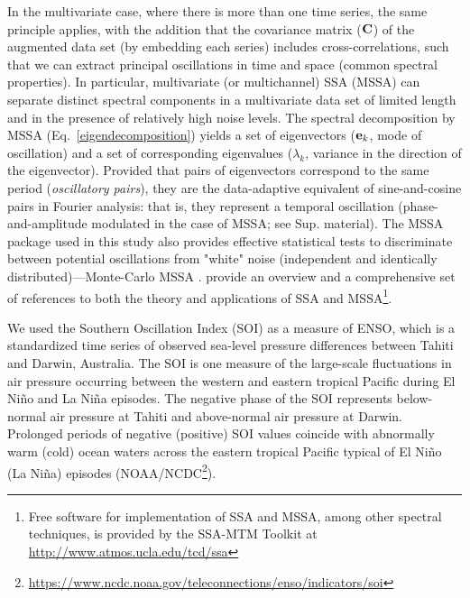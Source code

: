 In the multivariate case, where there is more than one time series, the same principle applies, with the addition that the covariance matrix ($\mathbf{C}$) of the augmented data set (by embedding each series) includes cross-correlations, such that we can extract principal oscillations in time and space (common spectral properties). In particular, multivariate (or multichannel) SSA (MSSA) can separate distinct spectral components in a multivariate data set of limited length and in the presence of relatively high noise levels. The spectral decomposition by MSSA (Eq.~\ref{eigendecomposition}) yields a set of eigenvectors ($\mathbf{e}_k$, mode of oscillation) and a set of corresponding eigenvalues ($\lambda_k$, variance in the direction of the eigenvector). Provided that pairs of eigenvectors correspond to the same period ({\it oscillatory pairs}), they are the data-adaptive equivalent of sine-and-cosine pairs in Fourier  analysis: that is, they represent a temporal oscillation (phase-and-amplitude modulated in the case of MSSA; see Sup. material). The MSSA package used in this study also provides effective statistical tests to discriminate between potential oscillations from "white" noise (independent and identically distributed)---Monte-Carlo MSSA \parencite{Allen1996}. \textcite{Ghil2002} provide an overview and a comprehensive set of references to both the theory and applications of SSA and MSSA\footnote{Free software for implementation of SSA and MSSA, among other spectral techniques, is provided by the SSA-MTM Toolkit at \url{http://www.atmos.ucla.edu/tcd/ssa}}.

We used the Southern Oscillation Index (SOI) as a measure of ENSO, which is a standardized time series of observed sea-level pressure differences between Tahiti and Darwin, Australia. The SOI is one measure of the large-scale fluctuations in air pressure occurring between the western and eastern tropical Pacific during El Ni\~no and La Ni\~na episodes. The negative phase of the SOI represents below-normal air pressure at Tahiti and above-normal air pressure at Darwin. Prolonged periods of negative (positive) SOI values coincide with abnormally warm (cold) ocean waters across the eastern tropical Pacific typical of El Ni\~no (La Ni\~na) episodes (NOAA/NCDC\footnote{\url{https://www.ncdc.noaa.gov/teleconnections/enso/indicators/soi}}).

